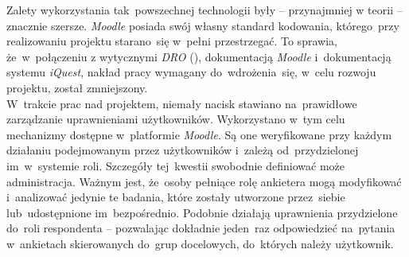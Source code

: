 Zalety wykorzystania tak~powszechnej technologii były -- przynajmniej w teorii -- znacznie szersze. \textit{Moodle} posiada swój własny standard kodowania, którego~przy realizowaniu projektu starano~się w~pełni przestrzegać. To sprawia, że~w~połączeniu z wytycznymi \textit{DRO} (), dokumentacją \textit{Moodle} i~dokumentacją systemu \textit{iQuest}, nakład pracy wymagany do~wdrożenia~się, w~celu rozwoju projektu, został zmniejszony. \\

W~trakcie prac nad projektem, niemały nacisk stawiano na~prawidłowe zarządzanie uprawnieniami użytkowników. Wykorzystano w~tym celu mechanizmy dostępne w~platformie \textit{Moodle}. Są one weryfikowane przy każdym działaniu podejmowanym przez użytkowników i~zależą od~przydzielonej im~w~systemie roli. Szczegóły tej~kwestii swobodnie definiować może administracja. Ważnym jest, że~osoby pełniące rolę ankietera mogą modyfikować i~analizować jedynie te badania, które zostały utworzone przez~siebie lub~udostępnione im~bezpośrednio. Podobnie działają uprawnienia przydzielone do~roli respondenta -- pozwalając dokładnie jeden~raz odpowiedzieć na~pytania w~ankietach skierowanych do~grup docelowych, do~których należy użytkownik.